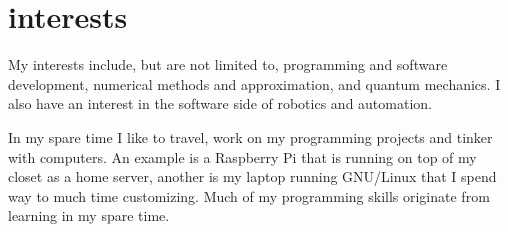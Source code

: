 \documentclass[]{twentysecondcv}
\begin{document}






\makeprofile


\section{interests}
My interests include, but are not limited to, programming and software
development, numerical methods and approximation, and quantum
mechanics. I also have an interest in the software side of robotics
and automation.

In my spare time I like to travel, work on my programming projects and
tinker with computers. An example is a Raspberry Pi that is running on
top of my closet as a home server, another is my laptop running
GNU/Linux that I spend way to much time customizing. Much of my
programming skills originate from learning in my spare time.
\end{document}
